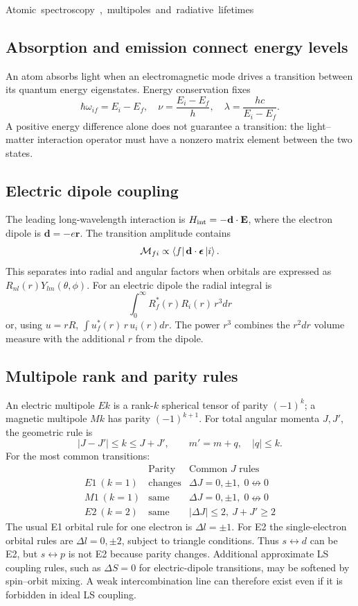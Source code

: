 \unit{Atomic spectroscopy, multipoles and radiative lifetimes}
\subsection{Absorption and emission connect energy levels}
An atom absorbs light when an electromagnetic
mode drives a transition between its
quantum energy eigenstates. Energy
conservation fixes
\[
\hbar\omega_{if}=E_i-E_f,\quad
\nu=\frac{E_i-E_f}{h},\quad
\lambda=\frac{hc}{E_i-E_f}.
\]
A positive energy difference alone does
not guarantee a transition:
the light--matter interaction operator
must have a nonzero matrix element
between the two states.

\subsection{Electric dipole coupling}
The leading long-wavelength interaction
is \(H_{\rm int}=-\mathbf d\cdot\mathbf E\),
where the electron dipole is \(\mathbf d=-e\mathbf r\).
The transition amplitude contains
\[
\mathcal M_{fi}\propto
\left\langle f\right\rvert\mathbf d\cdot\boldsymbol\epsilon\left\lvert i\right\rangle.
\]
This separates into radial and angular
factors when orbitals are expressed as
\(R_{nl}(r)Y_{lm}(\theta,\phi)\).
For an electric dipole the radial integral is
\[
\boxed{\int_0^\infty
R_f^*(r)R_i(r)\,r^3dr}
\]
or, using \(u=rR\),
\(\int u_f^*(r)\,r\,u_i(r)dr\).
The power \(r^3\) combines the
\(r^2dr\) volume measure with
the additional \(r\) from the dipole.

\subsection{Multipole rank and parity rules}
An electric multipole \(Ek\)
is a rank-\(k\) spherical tensor
of parity \((-1)^k\);
a magnetic multipole \(Mk\)
has parity \((-1)^{k+1}\).
For total angular momenta \(J,J'\),
the geometric rule is
\[
\boxed{|J-J'|\le k\le J+J',\qquad
m'=m+q,\quad |q|\le k.}
\]
For the most common transitions:
\[
\begin{array}{l|l|l}
&\text{Parity}&\text{Common }J\text{ rules}\\\hline
E1\ (k=1)&\text{changes}&
\Delta J=0,\pm1,\;0\nleftrightarrow0\\
M1\ (k=1)&\text{same}&
\Delta J=0,\pm1,\;0\nleftrightarrow0\\
E2\ (k=2)&\text{same}&
|\Delta J|\le2,\ J+J'\ge2
\end{array}
\]
The usual E1 orbital rule for one electron
is \(\Delta l=\pm1\).
For E2 the single-electron orbital rules
are \(\Delta l=0,\pm2\), subject to triangle
conditions. Thus \(s\leftrightarrow d\)
can be E2, but \(s\leftrightarrow p\)
is not E2 because parity changes.
Additional approximate LS coupling rules,
such as \(\Delta S=0\) for electric-dipole
transitions, may be softened by spin--orbit
mixing. A weak intercombination line can
therefore exist even if it is forbidden
in ideal LS coupling.

